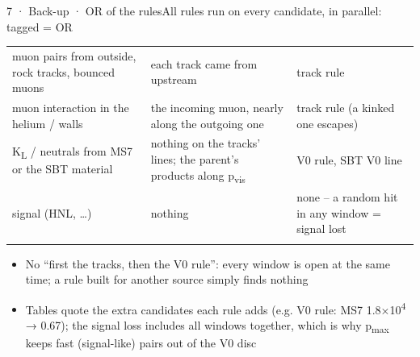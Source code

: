 \begin{btframe}{7 · Back-up · OR of the rules}{All rules run on every candidate, in parallel: tagged = OR}
{\begin{tabularx}{\linewidth}{>{\raggedright\arraybackslash}X>{\raggedright\arraybackslash}X>{\raggedright\arraybackslash}X}
muon pairs from outside, rock tracks, bounced muons & each track came from upstream & track rule \\\rowrule
muon interaction in the helium / walls & the incoming muon, nearly along the outgoing one & track rule (a kinked one escapes) \\\rowrule
K\textsubscript{L} / neutrals from MS7 or the SBT material & nothing on the tracks' lines; the parent's products along p\textsubscript{vis} & V0 rule, SBT V0 line \\\rowrule
\rowcolor{tint}signal (HNL, …) & nothing & none -- a random hit in any window = signal lost \\\rowrule
\end{tabularx}\par}
\vspace{3pt}
{\fontsize{6.15pt}{8.60pt}\selectfont
\begin{itemize}
  \item No “first the tracks, then the V0 rule”: every window is open at the same time; a rule built for another source simply finds nothing
  \item Tables quote the extra candidates each rule adds (e.g. V0 rule: MS7 1.8×10\textsuperscript{4} → 0.67); the signal loss includes all windows together, which is why p\textsubscript{max} keeps fast (signal-like) pairs out of the V0 disc
\end{itemize}}
\end{btframe}
